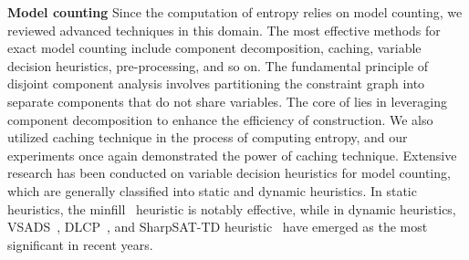 \textbf{Model counting}
Since the computation of entropy relies on model counting, we reviewed advanced techniques in this domain.
The most effective methods for exact model counting include component decomposition, caching, variable decision heuristics, pre-processing, and so on.
The fundamental principle of disjoint component analysis involves partitioning the constraint graph into separate components that do not share variables.
The core of \ADDAND lies in leveraging component decomposition to enhance the efficiency of construction.
We also utilized caching technique in the process of computing entropy, and our experiments once again demonstrated the power of caching technique.
Extensive research has been conducted on variable decision heuristics for model counting, which are generally classified into static and dynamic heuristics.
In static heuristics, the \textsf{minfill}~\cite{darwiche2009modeling} heuristic is notably effective, while in dynamic heuristics, \textsf{VSADS}~\cite{sang2005heuristics}, \textsf{DLCP}~\cite{lai2021power}, and \textsf{SharpSAT-TD  heuristic}~\cite{korhonen2021integrating} have emerged as the most significant in recent years.
